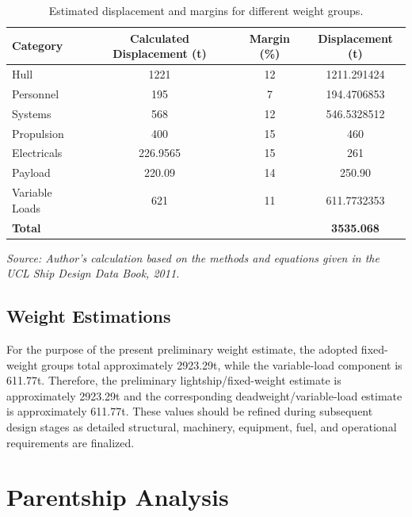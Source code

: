 \documentclass[12pt,a4paper,twoside]{report}
\begin{document}
\begin{table}[htbp]
    \centering
    \caption{Estimated displacement and margins for different weight groups.}
    \label{tab:displacement_margin}

    \begin{tabular}{lccc}
        \toprule
        \textbf{Category} &
        \textbf{Calculated Displacement (t)} &
        \textbf{Margin (\%)} &
        \textbf{Displacement (t)} \\
        \midrule

        Hull          & 1221 & 12 & 1211.291424 \\
        Personnel     & 195  & 7  & 194.4706853 \\
        Systems       & 568  & 12 & 546.5328512 \\
        Propulsion    & 400  & 15 & 460 \\
        Electricals   & 226.9565  & 15 & 261 \\
        Payload       & 220.09  & 14 & 250.90 \\
        Variable Loads & 621 & 11 & 611.7732353 \\
        \midrule
        \textbf{Total} & & & \textbf{3535.068} \\
        \bottomrule
    \end{tabular}

    \vspace{2mm}

    \footnotesize
    \textit{Source: Author's calculation based on the methods and equations given in the UCL Ship Design Data Book, 2011. \cite{ucl_ship_design_data_book}}

\end{table}
\subsection{Weight Estimations}
For the purpose of the present preliminary weight estimate, the adopted fixed-weight groups total approximately 2923.29t, while the variable-load component is 611.77t. Therefore, the preliminary lightship/fixed-weight estimate is approximately 2923.29t and the corresponding deadweight/variable-load estimate is approximately 611.77t. These values should be refined during subsequent design stages as detailed structural, machinery, equipment, fuel, and operational requirements are finalized.
\section{Parentship Analysis}
\end{document}

